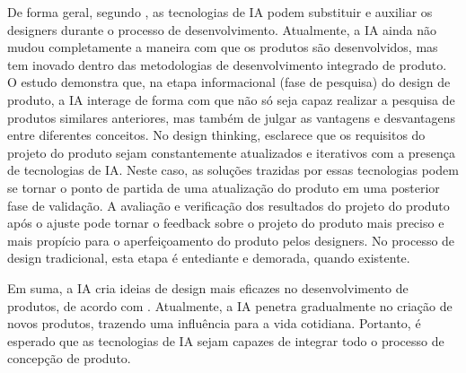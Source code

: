 De forma geral, segundo , as tecnologias de IA podem substituir e auxiliar os designers durante o processo de desenvolvimento. Atualmente, a IA ainda não mudou completamente a maneira com que os produtos são desenvolvidos, mas tem inovado dentro das metodologias de desenvolvimento integrado de produto. O estudo demonstra que, na etapa informacional (fase de pesquisa) do design de produto, a IA interage de forma com que não só seja capaz realizar a pesquisa de produtos similares anteriores, mas também de julgar as vantagens e desvantagens entre diferentes conceitos. No design thinking,  esclarece que os requisitos do projeto do produto sejam constantemente atualizados e iterativos com a presença de tecnologias de IA. Neste caso, as soluções trazidas por essas tecnologias podem se tornar o ponto de partida de uma atualização do produto em uma posterior fase de validação. A avaliação e verificação dos resultados do projeto do produto após o ajuste pode tornar o feedback sobre o projeto do produto mais preciso e mais propício para o aperfeiçoamento do produto pelos designers. No processo de design tradicional, esta etapa é entediante e demorada, quando existente.

Em suma, a IA cria ideias de design mais eficazes no desenvolvimento de produtos, de acordo com . Atualmente, a IA penetra gradualmente no criação de novos produtos, trazendo uma influência para a vida cotidiana. Portanto, é esperado que as tecnologias de IA sejam capazes de integrar todo o processo de concepção de produto.
